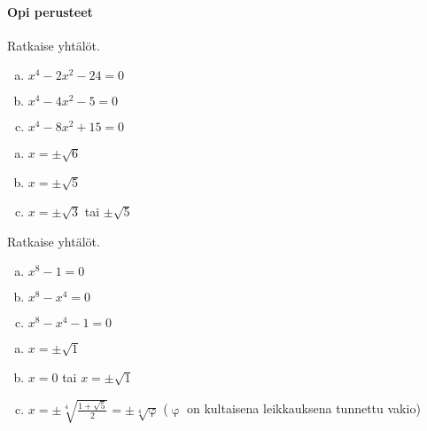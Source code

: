 \begin{tehtavasivu}

\paragraph*{Opi perusteet}

\begin{tehtava}
    Ratkaise yhtälöt.
    \begin{enumerate}[a)]
        \item $x^4 - 2x^2 - 24 = 0$
        \item $x^4 - 4x^2 - 5 = 0$
        \item $x^4 - 8x^2 + 15 = 0$
    \end{enumerate}
    \begin{vastaus}
        \begin{enumerate}[a)]
            \item $x = \pm\sqrt{6}$
            \item $x = \pm\sqrt{5}$
            \item $x = \pm\sqrt{3}$ tai $\pm\sqrt{5}$
        \end{enumerate}
    \end{vastaus}
\end{tehtava}

\begin{tehtava}
    Ratkaise yhtälöt.
    \begin{enumerate}[a)]
        \item $x^8 - 1 = 0$
        \item $x^8 - x^4 = 0$
        \item $x^8 - x^4 - 1 = 0$
    \end{enumerate}
    \begin{vastaus}
        \begin{enumerate}[a)]
            \item $x = \pm\sqrt{1}$
            \item $x = 0$ tai $x = \pm\sqrt{1}$
            \item $x = \pm\sqrt[4]{\frac{1+\sqrt{5}}{2}} = \pm\sqrt[4]{\upvarphi}$ ($\upvarphi$ on kultaisena leikkauksena tunnettu vakio)
        \end{enumerate}
    \end{vastaus}
\end{tehtava}


\end{tehtavasivu}
